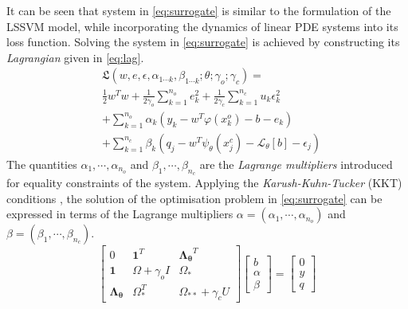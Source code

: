 It can be seen that system in \cref{eq:surrogate} is similar to the formulation of the LSSVM model, 
while incorporating the dynamics of linear PDE systems into its loss function. Solving the system 
in \cref{eq:surrogate} is achieved by constructing its \emph{Lagrangian} given in \cref{eq:lag}.
%
\begin{equation}\label{eq:lag}
  \begin{aligned}
    & \mathfrak{L}(
      w, e,\epsilon, \alpha_{1 \cdots k}, \beta_{1 \cdots k}; \theta; \gamma_{o}; \gamma_{c}
    ) = \\ 
    & \frac{1}{2} w^{T}w + \frac{1}{2\gamma_{o}} \sum_{k = 1}^{n_{o}}{e^{2}_{k}} +
    \frac{1}{2\gamma_{c}} \sum_{k = 1}^{n_{c}}{u_{k} \epsilon^{2}_{k}} \\
    & + \sum_{k = 1}^{n_{o}}{\alpha_{k}(y_{k} - w^{T}\varphi(x^{o}_{k}) - b - e_{k})} \\
    & + \sum_{k = 1}^{n_{c}}{\beta_{k} (q_{j} - w^{T}\psi_{\theta}(x^{c}_{j}) - 
    \mathcal{L}_{\theta}[b] - \epsilon_{j})} 
  \end{aligned}
\end{equation}
%
The quantities $\alpha_{1}, \cdots, \alpha_{n_{o}}$ and $\beta_{1}, \cdots, \beta_{n_{c}}$ are the 
\emph{Lagrange multipliers} introduced for equality constraints of the system. Applying the 
\emph{Karush-Kuhn-Tucker} (KKT) conditions \citep{karush1939minima,kuhn1951nonlinear}, the solution 
of the optimisation problem in \cref{eq:surrogate} can be expressed in terms of the Lagrange 
multipliers 
$\alpha = (\alpha_{1}, \cdots, \alpha_{n_{o}})$ and $\beta = (\beta_{1}, \cdots, \beta_{n_{c}})$.
%
\begin{equation}\label{eq:solution}
  \begin{bmatrix}
    0 & \mathbf{1}^{T} & \mathbf{\Lambda_{\theta}}^{T} \\ 
    \mathbf{1} & \Omega + \gamma_{o}I  & \Omega_*\\ 
    \mathbf{\Lambda_{\theta}} & \Omega_{*}^{T}  & \Omega_{**} + \gamma_{c}U 
  \end{bmatrix} \begin{bmatrix}
    b\\ 
    \alpha\\ 
    \beta
  \end{bmatrix} = \begin{bmatrix}
    0\\ 
    y\\ 
    q
  \end{bmatrix}
\end{equation}
